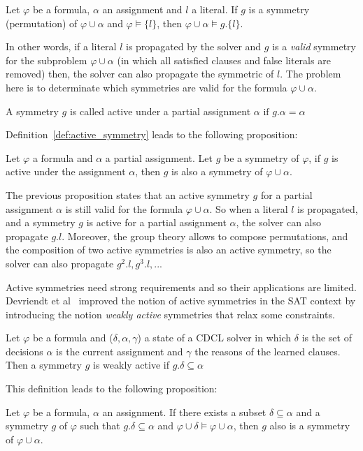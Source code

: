 \begin{proposition}
 \label{prop:symmetry_propagation}
 Let $\varphi$ be a formula, $\alpha$ an assignment and $l$ a literal. 
 If $g$ is a symmetry (permutation) of $\varphi \cup \alpha$ and
 $\varphi \models \{l\}$, then $\varphi \cup \alpha \models g.\{l\}$.
\end{proposition}
In other words, if a literal $l$ is propagated by the solver and $g$ is a \emph{valid} symmetry for the
subproblem $\varphi \cup \alpha$ (in which all satisfied clauses and false literals are removed) then, the solver can
also propagate the symmetric of $l$. The problem here is to determinate which symmetries are valid for the formula
$\varphi \cup \alpha$.
\begin{definition}
 \label{def:active_symmetry}
 A symmetry $g$ is called active under a partial assignment $\alpha$ $\text{if } g.\alpha = \alpha$
\end{definition}
Definition~\ref{def:active_symmetry} leads to the following proposition:
\begin{proposition}
 \label{prop:active_symmetry}
 Let $\varphi$ a formula and $\alpha$ a partial assignment. Let $g$ be a symmetry of $\varphi$,
 if $g$ is active under the assignment $\alpha$, then $g$ is also a symmetry of $\varphi \cup \alpha$.
\end{proposition}
The previous proposition states that an active symmetry $g$ for a partial assignment $\alpha$ is still valid for
the formula $\varphi \cup \alpha$. So when a literal $l$ is propagated, and a symmetry $g$ is active for a
partial assignment $\alpha$, the solver can also propagate $g.l$. 
Moreover, the group theory allows to compose permutations, and the composition of two active symmetries is also an active symmetry,
so the solver can also propagate $g^2.l, g^3.l, ... $

Active symmetries need strong requirements and so their applications are limited.
Devriendt et al~\cite{Devriendt12} improved the notion of active symmetries in the SAT context by
introducing the notion \emph{weakly active} symmetries that relax some constraints.
\begin{definition}
 \label{def:weakly_active_symmetry}
 Let $\varphi$ be a formula and ($\delta, \alpha, \gamma$) a state of a CDCL solver in which $\delta$ is the set of decisions
 $\alpha$ is the current assignment and $\gamma$ the reasons of the learned clauses. Then a symmetry $g$ is weakly active 
 if $g.\delta \subseteq \alpha$
\end{definition}
This definition leads to the following proposition:
\begin{proposition}
 Let $\varphi$ be a formula, $\alpha $ an assignment. If
 there exists a subset $\delta \subseteq \alpha $ and a symmetry $g$ of $\varphi$ such that 
 $g.\delta \subseteq \alpha $ and $\varphi \cup \delta \models \varphi \cup \alpha$, then $g$ 
 also is a symmetry of $\varphi \cup \alpha $.
\end{proposition}

